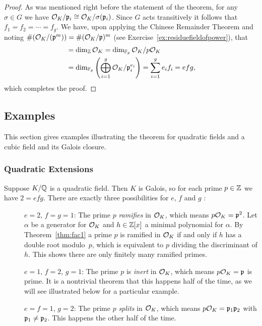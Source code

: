 \begin{proof}
  As was mentioned right before the statement of the theorem,
  for any $\sigma\in G$ we have $\mathcal{O}_K/\mathfrak{p}_i\cong \mathcal{O}_K/\sigma(\mathfrak{p}_i)$.
  Since $G$ acts transitively it follows that $f_1=f_2=\cdots = f_g$.
  We have, upon applying the Chinese Remainder Theorem
  and noting $\#(\mathcal{O}_K/(\mathfrak{p}^m)) = \#(\mathcal{O}_K/\mathfrak{p})^m$
  (see Exercise~\ref{ex:residuefieldofpower}), that
  \begin{align*}
    [K:\QQ]&= \dim_{\ZZ} \sO_K = \dim_{\FF_p} \sO_K/p\sO_K \\
    &= \dim_{\FF_p} \left(\bigoplus_{i=1}^g \sO_K/\p_i^{e_i}\right)
    = \sum_{i=1}^g e_i f_i
    = efg,
  \end{align*}
  which completes the proof.
\end{proof}

\subsection{Examples}

This section gives examples illustrating the theorem for quadratic fields
and a cubic field and its Galois closure.

\subsubsection{Quadratic Extensions}

Suppose $K/\mathbb{Q}$ is a quadratic field. 
Then $K$ is Galois, so for each prime $p\in\mathbb{Z}$ we have $2 = efg$.
There are exactly three possibilities for $e$, $f$ and $g$ :
\begin{description}
  \item[] $e=2$, $f=g=1$: The prime $p$ \emph{ramifies} in
  $\mathcal{O}_K$, which means $p\mathcal{O}_K = \mathfrak{p}^2$.  Let $\alpha$ be a generator for $\mathcal{O}_K$ and
  $h \in \mathbb{Z}[x]$ a minimal polynomial for $\alpha$.
  By Theorem~\ref{thm:fac1} a prime $p$ is ramified in $\mathcal{O}_K$ if and only if
  $h$ has a double root modulo~$p$, which is equivalent to $p$ dividing
  the discriminant of $h$. This shows there are only finitely many ramified
  primes.

  \item[] $e=1$, $f=2$, $g=1$: The prime $p$ is \emph{inert} in $\mathcal{O}_K$,
  which means $p\mathcal{O}_K = \mathfrak{p}$ is prime.  It is a nontrivial theorem that
  this happens half of the time,
  as we will see illustrated below for a particular example.

  \item[] $e=f=1$, $g=2$: The prime $p$ \emph{splits} in $\mathcal{O}_K$,
  which means $p\mathcal{O}_K = \mathfrak{p}_1\mathfrak{p}_2$ with $\mathfrak{p}_1\neq \mathfrak{p}_2$.  This happens the other
  half of the time.
\end{description}

